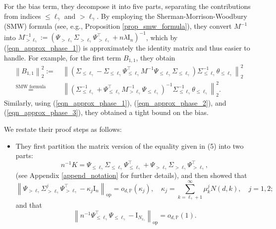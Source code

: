 \documentclass{article}
\theoremstyle{plain}
\theoremstyle{definition}
\theoremstyle{remark}
\begin{document}
\begin{appendix}
For the bias term, they decompose it into five parts, separating the contributions from indices $\leq \ell_{\gamma}$ and $> \ell_{\gamma}$. By employing the Sherman-Morrison-Woodbury (SMW) formula (see, e.g., Proposition \ref{prop_smw_formula}), they convert $M^{-1}$ into $M_{>\ell_{\gamma}}^{-1} := (\Psi_{>\ell_{\gamma}} \Sigma_{>\ell_{\gamma}} \Psi_{>\ell_{\gamma}}^{\top} + n\lambda \mathrm{I}_n)^{-1}$, which by (\ref{eqn_approx_phase_1}) is approximately the identity matrix and thus easier to handle. For example, for the first term $B_{1, 1}$, they obtain
    \begin{equation}\label{eqn_appro_bias_1_1_phase}
     \begin{aligned}
        \left\|B_{1, 1}\right\|_{2}^{2} 
        :=&~ \left\| \left( \Sigma_{\le \ell_{\gamma}} - \Sigma_{\le \ell_{\gamma}} \Psi^{\top}_{\le \ell_{\gamma}} M^{-1} \Psi_{\le \ell_{\gamma}} \Sigma_{\le \ell_{\gamma}}\right)  \Sigma_{\le \ell_{\gamma}}^{-1}  \theta_{\le \ell_{\gamma}} \right\|_{2}^{2}\\
        \overset{\text{ SMW formula } }{=} &~
        \left\| \left( \Sigma_{\le \ell_{\gamma}}^{-1} + \Psi_{\le \ell_{\gamma}}^{\top} M_{>\ell_{\gamma}}^{-1} \Psi_{\le \ell_{\gamma}}  \right)^{-1}  \Sigma_{\le \ell_{\gamma}}^{-1}  \theta_{\le \ell_{\gamma}} \right\|_{2}^{2}.
    \end{aligned}
    \end{equation}
    Similarly, using (\ref{eqn_approx_phase_1}), (\ref{eqn_approx_phase_2}), and (\ref{eqn_approx_phase_3}), they obtained a tight bound on the bias.



\iffalse
We restate their proof steps as follows:
\begin{itemize}
    \item They first partition the matrix version of the equality given in (5) into two parts:
$$
n^{-1} K = \Psi_{\leq \ell_{\gamma}} \Sigma_{\leq \ell_{\gamma}} \Psi_{\leq \ell_{\gamma}}^{\top} + \Psi_{>\ell_{\gamma}} \Sigma_{>\ell_{\gamma}} \Psi_{>\ell_{\gamma}}^{\top},
$$
(see Appendix \ref{append_notation} for further details), and  then showed that
\begin{equation}\label{eqn_approx_phase_1}
    \left\|\Psi_{>\ell_{\gamma}} \Sigma_{>\ell_{\gamma}}^j \Psi_{>\ell_{\gamma}}^{\top} - \kappa_j\mathrm{I}_n \right\|_{\mathrm{op}} = o_{d, \mathbb{P}}(\kappa_j), \quad \kappa_j = \sum_{k=\ell_{\gamma}+1}^\infty \mu_k^j N(d, k),\quad j=1,2;
\end{equation}
and that
\begin{equation}\label{eqn_approx_phase_2}
\left\| n^{-1}{\Psi_{\leq \ell_{\gamma}}^{\top} \Psi_{\leq \ell_{\gamma}} } - \mathrm{I}_{N_{\ell_{\gamma}}} \right\|_{\mathrm{op}} = o_{d, \mathbb{P}}(1).
\end{equation}


\end{itemize}
\end{appendix}
\end{document}
